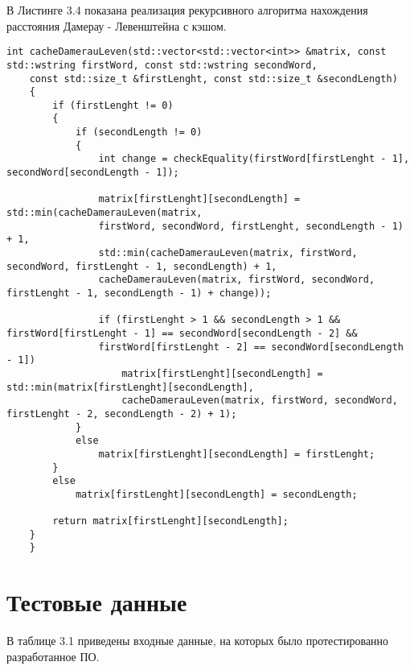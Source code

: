 \vspace{50mm}

В Листинге 3.4 показана реализация рекурсивного алгоритма нахождения расстояния Дамерау - Левенштейна с кэшом.
\begin{lstlisting}[caption=Рекурсивный алгоритм поиска расстояния Дамерау - Левенштейна с кэшом]
	int cacheDamerauLeven(std::vector<std::vector<int>> &matrix, const std::wstring firstWord, const std::wstring secondWord,
	const std::size_t &firstLenght, const std::size_t &secondLength)
	{
		if (firstLenght != 0)
		{
			if (secondLength != 0)
			{
				int change = checkEquality(firstWord[firstLenght - 1], secondWord[secondLength - 1]);
				
				matrix[firstLenght][secondLength] = std::min(cacheDamerauLeven(matrix, 
				firstWord, secondWord, firstLenght, secondLength - 1) + 1,
				std::min(cacheDamerauLeven(matrix, firstWord, secondWord, firstLenght - 1, secondLength) + 1,
				cacheDamerauLeven(matrix, firstWord, secondWord, firstLenght - 1, secondLength - 1) + change));
				
				if (firstLenght > 1 && secondLength > 1 && firstWord[firstLenght - 1] == secondWord[secondLength - 2] &&
				firstWord[firstLenght - 2] == secondWord[secondLength - 1])
					matrix[firstLenght][secondLength] = std::min(matrix[firstLenght][secondLength], 
					cacheDamerauLeven(matrix, firstWord, secondWord, firstLenght - 2, secondLength - 2) + 1);
			}
			else
				matrix[firstLenght][secondLength] = firstLenght;
		}
		else
			matrix[firstLenght][secondLength] = secondLength;
		
		return matrix[firstLenght][secondLength];
	}
	}
\end{lstlisting}

\section{Тестовые данные}

В таблице 3.1 приведены входные данные, на которых было протестированно разработанное ПО.

